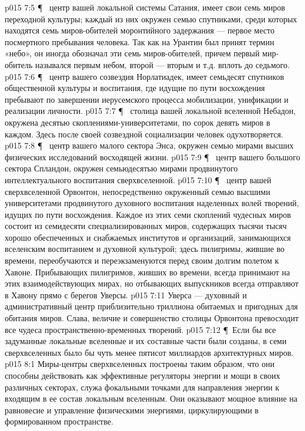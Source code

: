 \vs p015 7:5 \P\  центр вашей локальной системы Сатания, имеет свои семь миров переходной культуры; каждый из них окружен семью спутниками, среди которых находятся семь миров\hyp{}обителей моронтийного задержания --- первое место посмертного пребывания человека. Так как на Урантии был принят термин «небо», он иногда обозначал эти семь миров\hyp{}обителей, причем первый мир\hyp{}обитель назывался первым небом, второй --- вторым и т.д. вплоть до седьмого.
\vs p015 7:6 \P\  центр вашего созвездия Норлатиадек, имеет семьдесят спутников общественной культуры и воспитания, где идущие по пути восхождения пребывают по завершении иерусемского процесса мобилизации, унификации и реализации личности.
\vs p015 7:7 \P\  столица вашей локальной вселенной Небадон, окружена десятью скоплениями\hyp{}университетами, по сорок девять миров в каждом. Здесь после своей созвездной социализации человек одухотворяется.
\vs p015 7:8 \P\  центр вашего малого сектора Энса, окружен семью мирами высших физических исследований восходящей жизни.
\vs p015 7:9 \P\  центр вашего большого сектора Спландон, окружен семьюдесятью мирами продвинутого интеллектуального воспитания сверхвселенной.
\vs p015 7:10 \P\  центр вашей сверхвселенной Орвонтон, непосредственно окруженный семью высшими университетами продвинутого духовного воспитания наделенных волей творений, идущих по пути восхождения. Каждое из этих семи скоплений чудесных миров состоит из семидесяти специализированных миров, содержащих тысячи тысяч хорошо обеспеченных и снабжаемых институтов и организаций, занимающихся вселенским воспитанием и духовной культурой; здесь пилигримы, жившие во времени, переобучаются и переэкзаменуются перед своим долгим полетом к Хавоне. Прибывающих пилигримов, живших во времени, всегда принимают на этих взаимодействующих мирах, но отбывающих выпускников всегда отправляют в Хавону прямо с берегов Уверсы.
\vs p015 7:11 Уверса --- духовный и административный центр приблизительно триллиона обитаемых и пригодных для обитания миров. Слава, величие и совершенство столицы Орвонтона превосходит все чудеса пространственно\hyp{}временных творений.
\vs p015 7:12 \P\ Если бы все задуманные локальные вселенные и их составные части были созданы, в семи сверхвселенных было бы чуть менее пятисот миллиардов архитектурных миров.
\vs p015 8:1 Миры\hyp{}центры сверхвселенных построены таким образом, что они способны действовать как эффективные регуляторы энергии и мощи в своих различных секторах, служа фокальными точками для направления энергии к входящим в ее состав локальным вселенным. Они оказывают мощное влияние на равновесие и управление физическими энергиями, циркулирующими в формированном пространстве.
